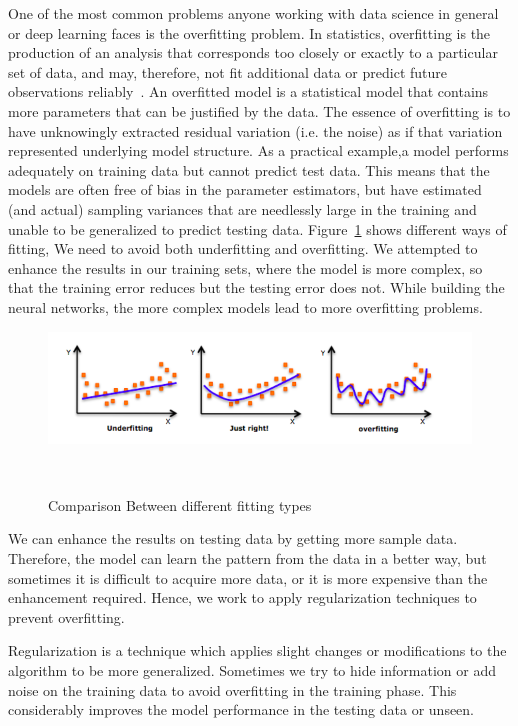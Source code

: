 One of the most common problems anyone working with data science in general or deep learning faces is the overfitting problem. In statistics, overfitting is the production of an analysis that corresponds too closely or exactly to a particular set of data, and may, therefore, not fit additional data or predict future observations reliably~\cite{Wiki_Overfitting}. An overfitted model is a statistical model that contains more parameters that can be justified by the data. The essence of overfitting is to have unknowingly extracted residual variation (i.e. the noise) as if that variation represented underlying model structure. As a practical example,a  model performs adequately on training data but cannot predict test data. This means that the models are often free of bias in the parameter estimators, but have estimated (and actual) sampling variances that are needlessly large in the training and unable to be generalized to predict testing data. Figure~\ref{Fig:Fitting} shows different ways of fitting, We need to avoid both underfitting and overfitting. We attempted to enhance the results in our training sets, where the model is more complex, so that the training error reduces but the testing error does not. While building the neural networks, the more complex models lead to more overfitting problems.%
%
\begin{figure}[!ht]
\centering
\includegraphics[scale=0.6]{./Figures/Ch_2_Background/Fig_Fitting.png}
\caption{Comparison Between different fitting types}~\label{Fig:Fitting}
\end{figure}%
%
We can enhance the results on testing data by getting more sample data. Therefore, the model can learn the pattern from the data in a better way, but sometimes it is difficult to acquire more data, or it is more expensive than the enhancement required. Hence, we work to apply regularization techniques to prevent overfitting.

Regularization is a technique which applies slight changes or modifications to the algorithm to be more generalized. Sometimes we try to hide information or add noise on the training data to avoid overfitting in the training phase. This considerably improves the model performance in the testing data or unseen.

